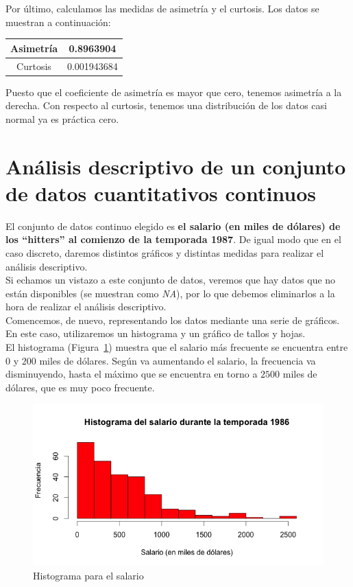 \documentclass[12pt,a4paper,twoside,openright,titlepage,final]{article}
\begin{document}
Por último, calculamos las medidas de asimetría y el curtosis. Los datos se muestran a continuación:

\begin{table}[htbp]
\centering
\begin{tabular}{|c|c|}
\hline Asimetría & 0.8963904 \\ 
\hline Curtosis & 0.001943684 \\
\hline 
\end{tabular} 
\end{table}

Puesto que el coeficiente de asimetría es mayor que cero, tenemos asimetría a la derecha. Con respecto al curtosis, tenemos una distribución de los datos casi normal ya es práctica cero.

\newpage 

\section{Análisis descriptivo de un conjunto de datos cuantitativos continuos}

El conjunto de datos continuo elegido es \textbf{el salario (en miles de dólares) de los ``hitters'' al comienzo de la temporada 1987}. De igual modo que en el caso discreto, daremos distintos gráficos y distintas medidas para realizar el análisis descriptivo.\\

Si echamos un vistazo a este conjunto de datos, veremos que hay datos que no están disponibles (se muestran como \textit{NA}), por lo que debemos eliminarlos a la hora de realizar el análisis descriptivo.\\

Comencemos, de nuevo, representando los datos mediante una serie de gráficos. En este caso, utilizaremos un histograma y un gráfico de tallos y hojas.\\

El histograma (Figura~\ref{fig:histograma_salario}) muestra que el salario más frecuente se encuentra entre $0$ y $200$ miles de dólares. Según va aumentando el salario, la frecuencia va disminuyendo, hasta el máximo que se encuentra en torno a $2500$ miles de dólares, que es muy poco frecuente.\\ 

\begin{figure}[tbph!]
\centering
\includegraphics[width=0.8\linewidth]{imagenes/histograma_salario}
\caption{Histograma para el salario}
\label{fig:histograma_salario}
\end{figure}
\end{document}
